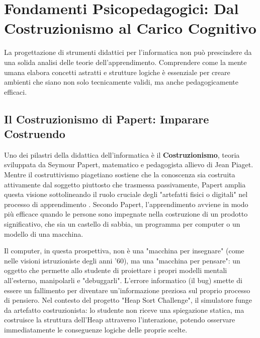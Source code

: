 \documentclass[openany]{theme/uniprthesis}
\begin{document}
\section{Fondamenti Psicopedagogici: Dal Costruzionismo al Carico Cognitivo}
La progettazione di strumenti didattici per l'informatica non può prescindere da una solida analisi delle teorie dell'apprendimento. Comprendere come la mente umana elabora concetti astratti e strutture logiche è essenziale per creare ambienti che siano non solo tecnicamente validi, ma anche pedagogicamente efficaci.

\subsection{Il Costruzionismo di Papert: Imparare Costruendo}
Uno dei pilastri della didattica dell'informatica è il \textbf{Costruzionismo}, teoria sviluppata da Seymour Papert, matematico e pedagogista allievo di Jean Piaget. Mentre il costruttivismo piagetiano sostiene che la conoscenza sia costruita attivamente dal soggetto piuttosto che trasmessa passivamente, Papert amplia questa visione sottolineando il ruolo cruciale degli "artefatti fisici o digitali" nel processo di apprendimento \cite{papert1980}. Secondo Papert, l'apprendimento avviene in modo più efficace quando le persone sono impegnate nella costruzione di un prodotto significativo, che sia un castello di sabbia, un programma per computer o un modello di una macchina.

Il computer, in questa prospettiva, non è una "macchina per insegnare" (come nelle visioni istruzioniste degli anni '60), ma una "macchina per pensare": un oggetto che permette allo studente di proiettare i propri modelli mentali all'esterno, manipolarli e "debuggarli". L'errore informatico (il bug) smette di essere un fallimento per diventare un'informazione preziosa sul proprio processo di pensiero. Nel contesto del progetto "Heap Sort Challenge", il simulatore funge da artefatto costruzionista: lo studente non riceve una spiegazione statica, ma costruisce la struttura dell'Heap attraverso l'interazione, potendo osservare immediatamente le conseguenze logiche delle proprie scelte.
\end{document}
